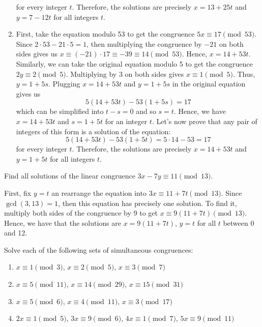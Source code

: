 \begin{solution}
\begin{enumerate}
        for every integer $t$. Therefore, the solutions are precisely $x = 13 + 25t$ and $y = 7 - 12t$ for all integers $t$.
        \item First, take the equation modulo 53 to get the congruence $5x \equiv 17 \pmod{53}$. Since $2 \cdot 53 - 21\cdot 5 = 1$, then multiplying the congruence by $-21$ on both sides gives us $x \equiv (-21) \cdot 17 \equiv -39 \equiv 14 \pmod{53}$. Hence, $x = 14 + 53t$. Similarly, we can take the original equation modulo 5 to get the congruence $2y \equiv 2 \pmod{5}$. Multiplying by 3 on both sides gives $x \equiv 1 \pmod{5}$. Thus, $y = 1 + 5s$. Plugging $x = 14 + 53t$ and $y = 1 + 5s$ in the original equation gives us 
        $$5(14 + 53t) - 53(1 + 5s) = 17$$
        which can be simplified into $t -s = 0$ and so $s = t$. Hence, we have $x = 14 + 53t$ and $s = 1 + 5t$ for an integer $t$. Let's now prove that any pair of integers of this form is a solution of the equation:
        $$5(14 + 53t) - 53(1 + 5t) = 5 \cdot 14 - 53 = 17$$
        for every integer $t$. Therefore, the solutions are precisely $x = 14 + 53t$ and $y = 1 + 5t$ for all integers $t$. \\
    \end{enumerate}
\end{solution}

\begin{exercise}
    Find all solutions of the linear congruence $3x - 7y \equiv 11 \pmod{13}$. \\
\end{exercise}

\begin{solution}
    First, fix $y = t$ an rearrange the equation into $3x \equiv 11 + 7t \pmod{13}$. Since $\gcd(3, 13) = 1$, then this equation has precisely one solution. To find it, multiply both sides of the congruence by 9 to get $x \equiv 9(11 + 7t) \pmod{13}$. Hence, we have that the solutions are $x = 9(11 + 7t)$, $y = t$ for all $t$ between 0 and 12. \\
\end{solution}

\begin{exercise}
    Solve each of the following sets of simultaneous congruences:
    \begin{enumerate}
        \item $x \equiv 1 \pmod 3$, $x \equiv 2 \pmod 5$, $x \equiv 3 \pmod 7$
        \item $x \equiv 5 \pmod{11}$, $x \equiv 14 \pmod{29}$, $x \equiv 15 \pmod{31}$
        \item $x \equiv 5 \pmod 6$, $x \equiv 4 \pmod{11}$, $x \equiv 3 \pmod{17}$
        \item $2x \equiv 1 \pmod 5$, $3x \equiv 9 \pmod 6$, $4x \equiv 1 \pmod 7$, $5x \equiv 9 \pmod{11}$
    \end{enumerate}
\end{exercise}

